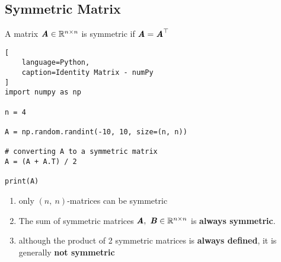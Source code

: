 \subsection{Symmetric Matrix}

A matrix $\text{\textbf{\textit{A}}} \in \mathbb{R}^{n\times n}$ is symmetric if $\text{\textbf{\textit{A}}} = \text{\textbf{\textit{A}}}^\top$
\hfill \cite{mfml/book/mml/Deisenroth-Faisal-Ong}


\begin{lstlisting}[
    language=Python,
    caption=Identity Matrix - numPy
]
import numpy as np

n = 4

A = np.random.randint(-10, 10, size=(n, n))

# converting A to a symmetric matrix
A = (A + A.T) / 2

print(A)
\end{lstlisting}

\begin{enumerate}
    \item only $(n,\ n)$-matrices can be symmetric
    \hfill \cite{mfml/book/mml/Deisenroth-Faisal-Ong}

    \item The sum of symmetric matrices $\text{\textbf{\textit{A}}},\ \text{\textbf{\textit{B}}} \in \mathbb{R}^{n\times n}$ is \textbf{always symmetric}. 
    \hfill \cite{mfml/book/mml/Deisenroth-Faisal-Ong}

    \item although the product of 2 symmetric matrices is \textbf{always defined}, it is generally \textbf{not symmetric}
    \hfill \cite{mfml/book/mml/Deisenroth-Faisal-Ong}
\end{enumerate}







